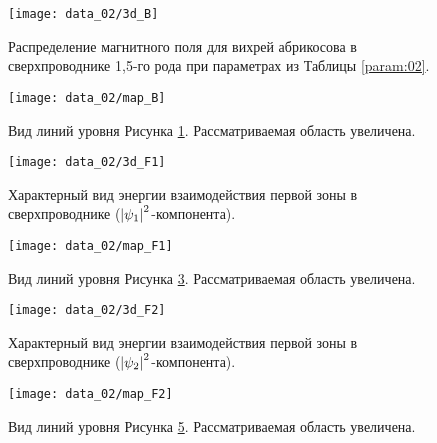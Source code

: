 \begin{figure}[h!]
    \center
    \texttt{[image: data\_02/3d\_B]}
    \caption{Распределение магнитного поля для вихрей абрикосова в 
        сверхпроводнике 1,5-го рода при параметрах из Таблицы \ref{param:02}.}
    \label{img:3d-field-B-02}
\end{figure}

\begin{figure}[h!]
    \center
    \texttt{[image: data\_02/map\_B]}
    \caption{Вид линий уровня Рисунка \ref{img:3d-field-B-02}. 
        Рассматриваемая область увеличена.}
    \label{img:map-field-B-02}
\end{figure}

\begin{figure}[h!]
    \center
    \texttt{[image: data\_02/3d\_F1]}
    \caption{Характерный вид энергии взаимодействия первой зоны в 
        сверхпроводнике (\( \left| \psi_1 \right|^2 \)-компонента).}
    \label{img:3d-band-1-02}
\end{figure}

\begin{figure}[h!]
    \center
    \texttt{[image: data\_02/map\_F1]}
    \caption{Вид линий уровня Рисунка \ref{img:3d-band-1-02}. 
        Рассматриваемая область увеличена.}
    \label{img:map-band-1-02}
\end{figure}

\begin{figure}[h!]
    \center
    \texttt{[image: data\_02/3d\_F2]}
    \caption{Характерный вид энергии взаимодействия первой зоны в 
        сверхпроводнике (\( \left| \psi_2 \right|^2 \)-компонента).}
    \label{img:3d-band-2-02}
\end{figure}

\begin{figure}[h!]
    \center
    \texttt{[image: data\_02/map\_F2]}
    \caption{Вид линий уровня Рисунка \ref{img:3d-band-2-02}. 
        Рассматриваемая область увеличена.}
    \label{img:map-band-2-02}
\end{figure}

\clearpage



